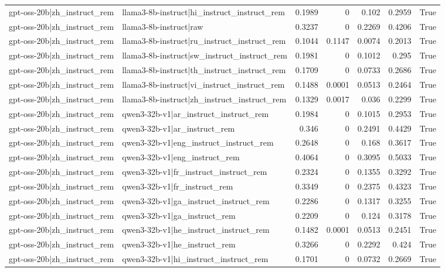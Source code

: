 \begin{table}
\begin{tabular}{l l r r r r l}
gpt-oss-20b|zh_instruct_rem & llama3-8b-instruct|hi_instruct_instruct_rem & 0.1989 & 0 & 0.102 & 0.2959 & True \\
gpt-oss-20b|zh_instruct_rem & llama3-8b-instruct|raw & 0.3237 & 0 & 0.2269 & 0.4206 & True \\
gpt-oss-20b|zh_instruct_rem & llama3-8b-instruct|ru_instruct_instruct_rem & 0.1044 & 0.1147 & 0.0074 & 0.2013 & True \\
gpt-oss-20b|zh_instruct_rem & llama3-8b-instruct|sw_instruct_instruct_rem & 0.1981 & 0 & 0.1012 & 0.295 & True \\
gpt-oss-20b|zh_instruct_rem & llama3-8b-instruct|th_instruct_instruct_rem & 0.1709 & 0 & 0.0733 & 0.2686 & True \\
gpt-oss-20b|zh_instruct_rem & llama3-8b-instruct|vi_instruct_instruct_rem & 0.1488 & 0.0001 & 0.0513 & 0.2464 & True \\
gpt-oss-20b|zh_instruct_rem & llama3-8b-instruct|zh_instruct_instruct_rem & 0.1329 & 0.0017 & 0.036 & 0.2299 & True \\
gpt-oss-20b|zh_instruct_rem & qwen3-32b-v1|ar_instruct_instruct_rem & 0.1984 & 0 & 0.1015 & 0.2953 & True \\
gpt-oss-20b|zh_instruct_rem & qwen3-32b-v1|ar_instruct_rem & 0.346 & 0 & 0.2491 & 0.4429 & True \\
gpt-oss-20b|zh_instruct_rem & qwen3-32b-v1|eng_instruct_instruct_rem & 0.2648 & 0 & 0.168 & 0.3617 & True \\
gpt-oss-20b|zh_instruct_rem & qwen3-32b-v1|eng_instruct_rem & 0.4064 & 0 & 0.3095 & 0.5033 & True \\
gpt-oss-20b|zh_instruct_rem & qwen3-32b-v1|fr_instruct_instruct_rem & 0.2324 & 0 & 0.1355 & 0.3292 & True \\
gpt-oss-20b|zh_instruct_rem & qwen3-32b-v1|fr_instruct_rem & 0.3349 & 0 & 0.2375 & 0.4323 & True \\
gpt-oss-20b|zh_instruct_rem & qwen3-32b-v1|ga_instruct_instruct_rem & 0.2286 & 0 & 0.1317 & 0.3255 & True \\
gpt-oss-20b|zh_instruct_rem & qwen3-32b-v1|ga_instruct_rem & 0.2209 & 0 & 0.124 & 0.3178 & True \\
gpt-oss-20b|zh_instruct_rem & qwen3-32b-v1|he_instruct_instruct_rem & 0.1482 & 0.0001 & 0.0513 & 0.2451 & True \\
gpt-oss-20b|zh_instruct_rem & qwen3-32b-v1|he_instruct_rem & 0.3266 & 0 & 0.2292 & 0.424 & True \\
gpt-oss-20b|zh_instruct_rem & qwen3-32b-v1|hi_instruct_instruct_rem & 0.1701 & 0 & 0.0732 & 0.2669 & True \\

\end{tabular}
\end{table}
